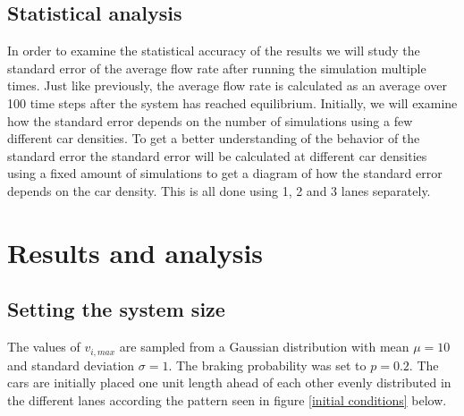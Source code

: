\documentclass[a4paper,12pt]{article}
\begin{document}
\subsection*{Statistical analysis}
In order to examine the statistical accuracy of the results we will study the standard error of the average flow rate after running the simulation multiple times. 
Just like previously, the average flow rate is calculated as an average over 100 time steps after the system has reached equilibrium. Initially, we will examine how the standard error
depends on the number of simulations using a few different car densities. To get a better understanding of the behavior of the standard error the standard error will be calculated
at different car densities using a fixed amount of simulations to get a diagram of how the standard error depends on the car density. This is all done using 1, 2 and 3 lanes separately.

\section*{Results and analysis}
\subsection*{Setting the system size}
The values of $v_{i,max}$ are sampled from a Gaussian distribution with mean $\mu = 10$ and standard deviation $\sigma = 1$. The braking probability
was set to $p=0.2$. The cars are initially placed one unit length ahead of each other evenly distributed in the different lanes according the 
pattern seen in figure \ref*{initial conditions} below.
\end{document}
